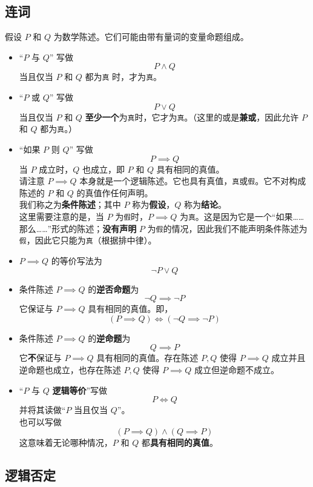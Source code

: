 \subsection{连词}

假设 $P$ 和 $Q$ 为数学陈述。它们可能由带有量词的变量命题组成。

\begin{itemize}
    \item ``$P$ 与 $Q$'' 写做
        \[P \land Q\]
        当且仅当 $P$ 和 $Q$ 都为\verb|真| 时，才为\verb|真|。
    \item ``$P$ 或 $Q$'' 写做
        \[P \lor Q\]
        当且仅当 $P$ 和 $Q$ \textbf{至少一个}为\verb|真|时，它才为\verb|真|。（这里的或是\textbf{兼或}，因此允许 $P$ 和 $Q$ 都为\verb|真|。）
    \item ``如果 $P$ 则 $Q$'' 写做
        \[P \implies Q\]
        当 $P$ 成立时，$Q$ 也成立，即 $P$ 和 $Q$ 具有相同的真值。\\
        请注意 $P \implies Q$ 本身就是一个逻辑陈述。它也具有真值，\verb|真|或\verb|假|。它不对构成陈述的 $P$ 和 $Q$ 的真值作任何声明。\\
        我们称之为\textbf{条件陈述}；其中 $P$ 称为\textbf{假设}，$Q$ 称为\textbf{结论}。\\
        这里需要注意的是，当 $P$ 为\verb|假|时，$P \implies Q$ 为\verb|真|。这是因为它是一个``如果……那么……''形式的陈述；\textbf{没有声明} $P$ 为\verb|假|的情况，因此我们不能声明条件陈述为\verb|假|，因此它只能为\verb|真|（根据排中律）。
    \item $P \implies Q$ 的等价写法为
        \[\neg P \lor Q\]
    \item 条件陈述 $P \implies Q$ 的\textbf{逆否命题}为
        \[\neg Q \implies \neg P\]
        它保证与 $P \implies Q$ 具有相同的真值。即，
        \[(P \implies Q) \iff (\neg Q \implies \neg P)\]
    \item 条件陈述 $P \implies Q$ 的\textbf{逆命题}为
        \[Q \implies P\]
        它\textbf{不}保证与 $P \implies Q$ 具有相同的真值。存在陈述 $P, Q$ 使得 $P \implies Q$ 成立并且逆命题也成立，也存在陈述 $P, Q$ 使得 $P \implies Q$ 成立但逆命题不成立。
    \item ``$P$ 与 $Q$ \textbf{逻辑等价}''写做
        \[P \iff Q\]
        并将其读做``$P$ 当且仅当 $Q$''。\\
        也可以写做
        \[(P \implies Q) \land (Q \implies P)\]
        这意味着无论哪种情况，$P$ 和 $Q$ 都\textbf{具有相同的真值}。
\end{itemize}

\subsection{逻辑否定}

